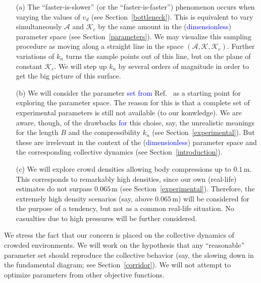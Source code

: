 \documentclass[preprint,12pt]{elsarticle}
\begin{document}
\begin{itemize}
 \item[(a)] The ``faster-is-slower'' (or the ``faster-is-faster'') phenomenon 
occurs when varying the values of $v_d$ (see Section~\ref{bottleneck}). This is 
equivalent to vary simultaneously $\mathcal{A}$ and $\mathcal{K}_c$ by the same 
amount in the (\textcolor{blue}{dimensionless}) parameter space (see Section~\ref{parameters}). We 
may visualize this sampling procedure as moving along a straight line in the 
space $(\mathcal{A},\mathcal{K},\mathcal{K}_c)$. Further variations of 
$k_n$ turns the sample points out of this line, but on the plane of constant
$\mathcal{K}_c$. We will step up $k_n$ by several orders of magnitude in order 
to get the big picture of this surface. 

\item[(b)] We will consider the parameter \textcolor{blue}{set from} Ref.~\cite{helbing_2000} 
as a starting point for exploring the parameter space. The reason for this is 
that a complete set of experimental parameters is still not available (to our 
konwledge). We are aware, though, of the drawbacks \textcolor{blue}{for} this choise, say, the 
unrealistic meanings for the length $B$ and the compressibility $k_n$ (see 
Section~\ref{experimental}). But these are irrelevant in the context of the 
(\textcolor{blue}{dimensionless}) parameter space and the corresponding collective dynamics (see 
Section~\ref{introduction}). 

\item[(c)] We will explore crowd densities allowing body compressions up to 
$0.1\,$m. This corresponds to remarkably high densities, since our own 
(real-life) estimates do not surpass $0.065\,$m (see 
Section~\ref{experimental}). Therefore, the extremely high density 
scenarios (say, above $0.065\,$m) will be considered for the purpose of a 
tendency, but not as a common real-life situation. No casualties due to high 
pressures will be further considered. 

\end{itemize}

We stress the fact that our concern is placed on the collective dynamics of 
crowded environments. We will work on the hypothesis that any ``reasonable'' 
parameter set should reproduce the collective behavior (say, the slowing down 
in the fundamental diagram; see Section~\ref{corridor}). We will not attempt to 
optimize parameters from other objective functions. \\
\end{document}
